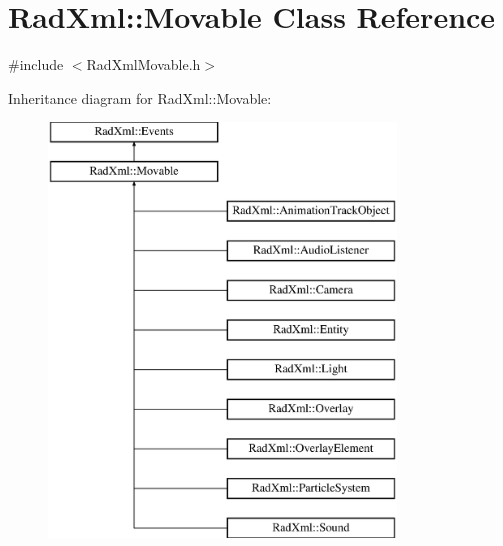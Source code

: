 \hypertarget{class_rad_xml_1_1_movable}{\section{Rad\-Xml\-:\-:Movable Class Reference}
\label{class_rad_xml_1_1_movable}
}


{\ttfamily \#include $<$Rad\-Xml\-Movable.\-h$>$}

Inheritance diagram for Rad\-Xml\-:\-:Movable\-:\begin{figure}[H]
\begin{center}
\leavevmode
\includegraphics[height=11.000000cm]{class_rad_xml_1_1_movable}
\end{center}
\end{figure}
